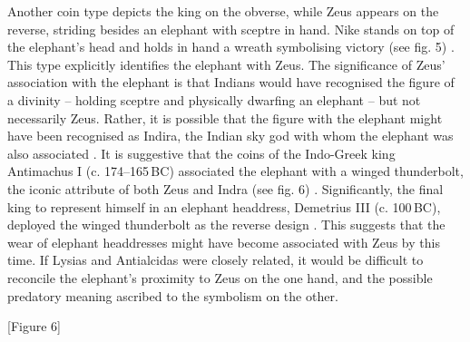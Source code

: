 \documentclass{ijsra}
\renewcommand\BC{{\,BC\xspace}}
\begin{document}
Another coin type depicts the king on the obverse, while Zeus appears on the reverse, striding besides an elephant with sceptre in hand. 
Nike stands on top of the elephant’s head and holds in hand a wreath symbolising victory (see fig. 5) \parencite[27]{Narain1991}. 
This type explicitly identifies the elephant with Zeus. 
The significance of Zeus’ association with the elephant is that Indians would have recognised the figure of a divinity
– holding sceptre and physically dwarfing an elephant – but not necessarily Zeus. 
Rather, it is possible that the figure with the elephant might have been recognised as Indira,
the Indian sky god with whom the elephant was also associated \parencite[247]{MacDowall2007b}. 
It is suggestive that the coins of the Indo-Greek king Antimachus I (c. 174--165\BC) associated the elephant with a winged thunderbolt,
the iconic attribute of both Zeus and Indra (see fig. 6) \parencites[242]{MacDowall2007b}[260]{Narain2003}.
Significantly, the final king to represent himself in an elephant headdress, Demetrius III (c. 100\BC),
deployed the winged thunderbolt as the reverse design \parencites[17--18]{Kalita1997}[362]{Sircar2008}.
This suggests that the wear of elephant headdresses might have become associated with Zeus by this time. 
If Lysias and Antialcidas were closely related, it would be difficult to reconcile the elephant’s proximity to Zeus on the one hand,
and the possible predatory meaning ascribed to the symbolism on the other.

[Figure 6]
\end{document}
